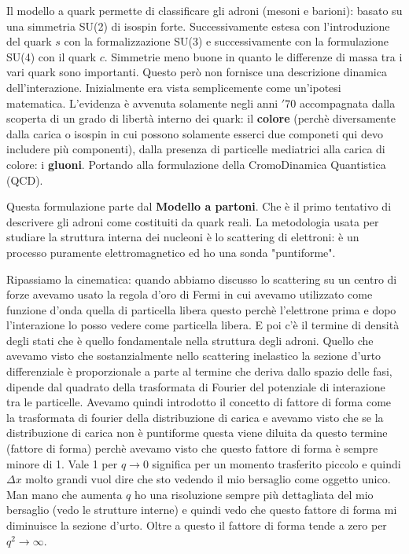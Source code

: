 Il modello a quark permette di classificare gli adroni (mesoni e barioni): basato su una simmetria SU(2) di isospin forte. Successivamente estesa con l'introduzione del quark $s$ con la formalizzazione SU(3) e successivamente con la formulazione SU(4) con il quark $c$. Simmetrie meno buone in quanto le differenze di massa tra i vari quark sono importanti. Questo però non fornisce una descrizione dinamica dell'interazione. Inizialmente era vista semplicemente come un'ipotesi matematica. L'evidenza è avvenuta solamente negli anni $'70$ accompagnata dalla scoperta di un grado di libertà interno dei quark: il \textbf{colore} (perchè diversamente dalla carica o isospin in cui possono solamente esserci due componeti qui devo includere più componenti), dalla presenza di particelle mediatrici alla carica di colore: i \textbf{gluoni}. Portando alla formulazione della CromoDinamica Quantistica (QCD).

Questa formulazione parte dal \textbf{Modello a partoni}. Che è il primo tentativo di descrivere gli adroni come costituiti da quark reali. La metodologia usata per studiare la struttura interna dei nucleoni è lo scattering di elettroni: è un processo puramente elettromagnetico ed ho una sonda "puntiforme".

Ripassiamo la cinematica: quando abbiamo discusso lo scattering su un centro di forze avevamo usato la regola d'oro di Fermi in cui avevamo utilizzato come funzione d'onda quella di particella libera questo perchè l'elettrone prima e dopo l'interazione lo posso vedere come particella libera. E poi c'è il termine di densità degli stati che è quello fondamentale nella struttura degli adroni. Quello che avevamo visto che sostanzialmente nello scattering inelastico la sezione d'urto differenziale è proporzionale a parte al termine che deriva dallo spazio delle fasi, dipende dal quadrato della trasformata di Fourier del potenziale di interazione tra le particelle. Avevamo quindi introdotto il concetto di fattore di forma come la trasformata di fourier della distribuzione di carica e avevamo visto che se la distribuzione di carica non è puntiforme questa viene diluita da questo termine (fattore di forma) perchè avevamo visto che questo fattore di forma è sempre minore di 1. Vale 1 per $q\to0$ significa per un momento trasferito piccolo e quindi $\Delta x$ molto grandi vuol dire che sto vedendo il mio bersaglio come oggetto unico. Man mano che aumenta $q$ ho una risoluzione sempre più dettagliata del mio bersaglio (vedo le strutture interne) e quindi vedo che questo fattore di forma mi diminuisce la sezione d'urto. Oltre a questo il fattore di forma tende a zero per $q^2\to\infty$. 
